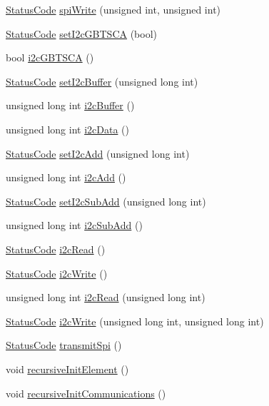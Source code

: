 \begin{DoxyCompactItemize}
\item 
\hyperlink{classStatusCode}{StatusCode} \hyperlink{classSeqPGA_a3cc382925053df4b2fc7d3a99b4def20}{spiWrite} (unsigned int, unsigned int)
\item 
\hyperlink{classStatusCode}{StatusCode} \hyperlink{classSeqPGA_aef7911620b07d8aeef2a9ec95fa58ca4}{setI2cGBTSCA} (bool)
\item 
bool \hyperlink{classSeqPGA_a1d9edf6e3303581efe0bdb1b8b3fff0c}{i2cGBTSCA} ()
\item 
\hyperlink{classStatusCode}{StatusCode} \hyperlink{classSeqPGA_ab93beca49a31c1f9fddc915e9efeeaa0}{setI2cBuffer} (unsigned long int)
\item 
unsigned long int \hyperlink{classSeqPGA_a3d441522bfe5a6d35b8a77cbcd38b49e}{i2cBuffer} ()
\item 
unsigned long int \hyperlink{classSeqPGA_a5e48f7b7ca1ada5a1decc0436dda4b26}{i2cData} ()
\item 
\hyperlink{classStatusCode}{StatusCode} \hyperlink{classSeqPGA_a4ef334e4d2cb417b49033dce951728cd}{setI2cAdd} (unsigned long int)
\item 
unsigned long int \hyperlink{classSeqPGA_a67022684977cb2f6335eb6b21262fe89}{i2cAdd} ()
\item 
\hyperlink{classStatusCode}{StatusCode} \hyperlink{classSeqPGA_a348c5d982223fb5cf2878e5bf3c6429c}{setI2cSubAdd} (unsigned long int)
\item 
unsigned long int \hyperlink{classSeqPGA_a6c7137f9b45a20ecfcccf1d47e5af985}{i2cSubAdd} ()
\item 
\hyperlink{classStatusCode}{StatusCode} \hyperlink{classSeqPGA_a7cd344df2be99f3a02b487f80e87b27e}{i2cRead} ()
\item 
\hyperlink{classStatusCode}{StatusCode} \hyperlink{classSeqPGA_a429076ca3a4ece94182bd95c623bb9d0}{i2cWrite} ()
\item 
unsigned long int \hyperlink{classSeqPGA_a9cf54d57d77b04f54cc0fe516c3528b4}{i2cRead} (unsigned long int)
\item 
\hyperlink{classStatusCode}{StatusCode} \hyperlink{classSeqPGA_a4176b2047888421f8766d038e35bccfd}{i2cWrite} (unsigned long int, unsigned long int)
\item 
\hyperlink{classStatusCode}{StatusCode} \hyperlink{classSeqPGA_a579b4ab222e1c4778640948fbf2a8805}{transmitSpi} ()
\item 
void \hyperlink{classElement_a3c0abcb36f8906688bb7e32608df7086}{recursiveInitElement} ()
\item 
void \hyperlink{classElement_a82119ed37dff76508a2746a853ec35ba}{recursiveInitCommunications} ()

\end{DoxyCompactItemize}
